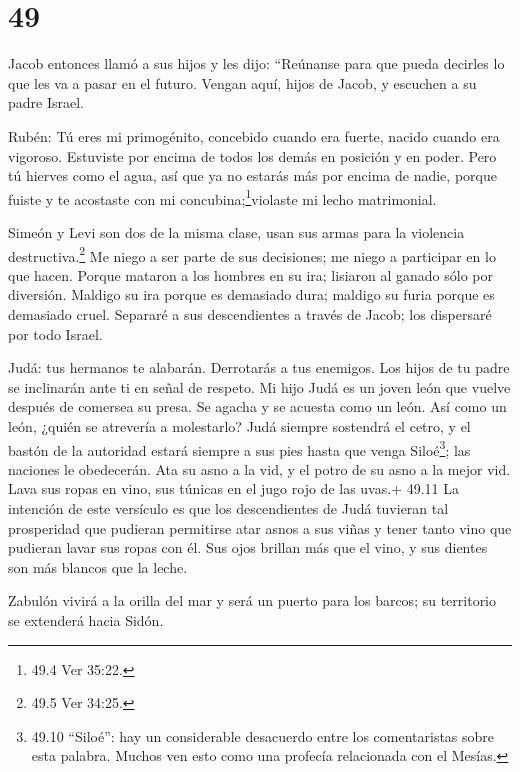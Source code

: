 \hypertarget{section-48}{%
\section{49}\label{section-48}}

 Jacob entonces llamó a sus hijos y les dijo: ``Reúnanse
para que pueda decirles lo que les va a pasar en el futuro. 
Vengan aquí, hijos de Jacob, y escuchen a su padre Israel.

 Rubén: Tú eres mi primogénito, concebido cuando era fuerte,
nacido cuando era vigoroso. Estuviste por encima de todos los demás en
posición y en poder.  Pero tú hierves como el agua, así que
ya no estarás más por encima de nadie, porque fuiste y te acostaste con
mi concubina;\footnote{49.4 Ver 35:22.}violaste mi lecho matrimonial.

 Simeón y Levi son dos de la misma clase, usan sus armas
para la violencia destructiva.\footnote{49.5 Ver 34:25.}  Me
niego a ser parte de sus decisiones; me niego a participar en lo que
hacen. Porque mataron a los hombres en su ira; lisiaron al ganado sólo
por diversión.  Maldigo su ira porque es demasiado dura;
maldigo su furia porque es demasiado cruel. Separaré a sus descendientes
a través de Jacob; los dispersaré por todo Israel.

 Judá: tus hermanos te alabarán. Derrotarás a tus enemigos.
Los hijos de tu padre se inclinarán ante ti en señal de respeto.
 Mi hijo Judá es un joven león que vuelve después de
comersea su presa. Se agacha y se acuesta como un león. Así como un
león, ¿quién se atrevería a molestarlo?  Judá siempre
sostendrá el cetro, y el bastón de la autoridad estará siempre a sus
pies hasta que venga Siloé\footnote{49.10 ``Siloé'': hay un considerable
  desacuerdo entre los comentaristas sobre esta palabra. Muchos ven esto
  como una profecía relacionada con el Mesías.}; las naciones le
obedecerán.  Ata su asno a la vid, y el potro de su asno a
la mejor vid. Lava sus ropas en vino, sus túnicas en el jugo rojo de las
uvas.+ 49.11 La intención de este versículo es que los descendientes de
Judá tuvieran tal prosperidad que pudieran permitirse atar asnos a sus
viñas y tener tanto vino que pudieran lavar sus ropas con él.
 Sus ojos brillan más que el vino, y sus dientes son más
blancos que la leche.

 Zabulón vivirá a la orilla del mar y será un puerto para
los barcos; su territorio se extenderá hacia Sidón.

